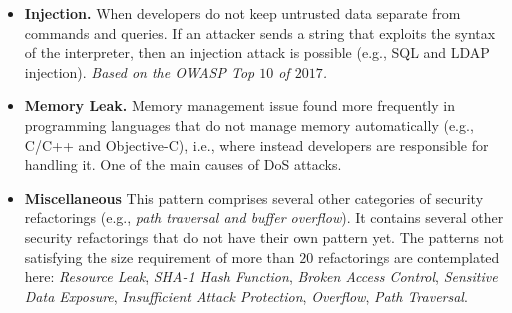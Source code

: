 \documentclass[10pt,conference]{IEEEtran}
\begin{document}
\begin{itemize}
    \item \textbf{Injection.} When developers do not keep untrusted data
    separate from commands and queries. If an attacker sends a string that
    exploits the syntax of the interpreter, then an injection attack is possible
    (e.g., SQL and LDAP injection). \textit{Based on the OWASP Top $10$ of
    $2017$.}

    \item \textbf{Memory Leak.} Memory management issue found more frequently in
    programming languages that do not manage memory automatically (e.g., C/C++
    and Objective-C), i.e., where instead developers are responsible for
    handling it. One of the main causes of DoS attacks.

    \item \textbf{Miscellaneous} This pattern comprises several other categories
    of security refactorings (e.g., \textit{path traversal and buffer
    overflow}). It contains several other security refactorings that do not have
    their own pattern yet. The patterns not satisfying the size requirement of
    more than $20$ refactorings are contemplated here: \textit{Resource Leak},
    \textit{SHA-1 Hash Function}, \textit{Broken Access Control},
    \textit{Sensitive Data Exposure}, \textit{Insufficient Attack Protection},
    \textit{Overflow}, \textit{Path Traversal}.
\end{itemize}
\end{document}

